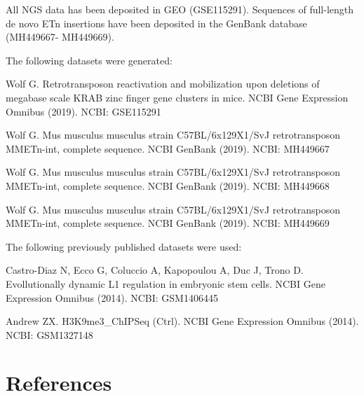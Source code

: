 \documentclass[11pt,a4paper]{article}
\begin{document}
All NGS data has been deposited in GEO (GSE115291). Sequences of full-length de novo ETn insertions have been deposited in the GenBank database (MH449667- MH449669).

The following datasets were generated:

Wolf G. Retrotransposon reactivation and mobilization upon deletions of megabase scale KRAB zinc finger gene clusters in mice. NCBI Gene Expression Omnibus (2019). NCBI: GSE115291

Wolf G. Mus musculus musculus strain C57BL/6x129X1/SvJ retrotransposon MMETn-int, complete sequence. NCBI GenBank (2019). NCBI: MH449667

Wolf G. Mus musculus musculus strain C57BL/6x129X1/SvJ retrotransposon MMETn-int, complete sequence. NCBI GenBank (2019). NCBI: MH449668

Wolf G. Mus musculus musculus strain C57BL/6x129X1/SvJ retrotransposon MMETn-int, complete sequence. NCBI GenBank (2019). NCBI: MH449669

The following previously published datasets were used:

Castro-Diaz N, Ecco G, Coluccio A, Kapopoulou A, Duc J, Trono D. Evollutionally dynamic L1 regulation in embryonic stem cells. NCBI Gene Expression Omnibus (2014). NCBI: GSM1406445

Andrew ZX. H3K9me3\_ChIPSeq (Ctrl). NCBI Gene Expression Omnibus (2014). NCBI: GSM1327148

\section{References}
\end{document}
